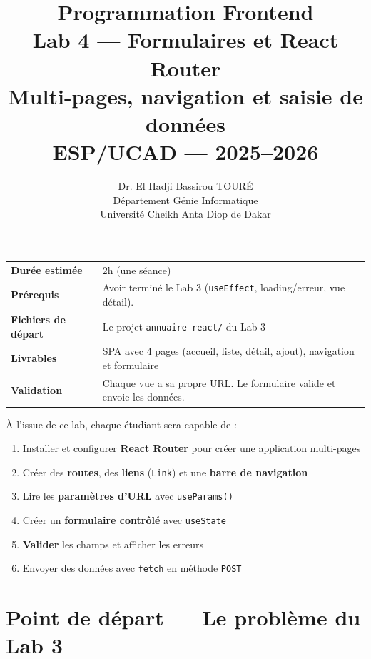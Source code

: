\documentclass[11pt,a4paper]{article}
\title{\vspace{-1cm}\textbf{\LARGE Programmation Frontend}\\[0.8cm]\textbf{\huge Lab 4 --- Formulaires et React Router}\\[0.3cm]\textbf{\Large Multi-pages, navigation et saisie de données}\\[0.5cm]\large ESP/UCAD --- 2025--2026}
\author{Dr. El Hadji Bassirou TOURÉ\\Département Génie Informatique\\Université Cheikh Anta Diop de Dakar}
\date{}
\begin{document}
\maketitle
\thispagestyle{empty}
\vspace{0.5cm}

\begin{prereqbox}
\begin{center}
\begin{tabular}{lp{10cm}}
\toprule
\textbf{Durée estimée} & 2h (une séance) \\
\textbf{Prérequis} & Avoir terminé le Lab 3 (\texttt{useEffect}, loading/erreur, vue détail). \\
\textbf{Fichiers de départ} & Le projet \texttt{annuaire-react/} du Lab 3 \\
\textbf{Livrables} & SPA avec 4 pages (accueil, liste, détail, ajout), navigation et formulaire \\
\textbf{Validation} & Chaque vue a sa propre URL. Le formulaire valide et envoie les données. \\
\bottomrule
\end{tabular}
\end{center}
\end{prereqbox}

\begin{objectifbox}
À l'issue de ce lab, chaque étudiant sera capable de :
\begin{enumerate}[nosep]
\item Installer et configurer \textbf{React Router} pour créer une application multi-pages
\item Créer des \textbf{routes}, des \textbf{liens} (\texttt{Link}) et une \textbf{barre de navigation}
\item Lire les \textbf{paramètres d'URL} avec \texttt{useParams()}
\item Créer un \textbf{formulaire contrôlé} avec \texttt{useState}
\item \textbf{Valider} les champs et afficher les erreurs
\item Envoyer des données avec \texttt{fetch} en méthode \texttt{POST}
\end{enumerate}
\end{objectifbox}

\tableofcontents
\newpage

\section{Point de départ --- Le problème du Lab 3}
\end{document}
